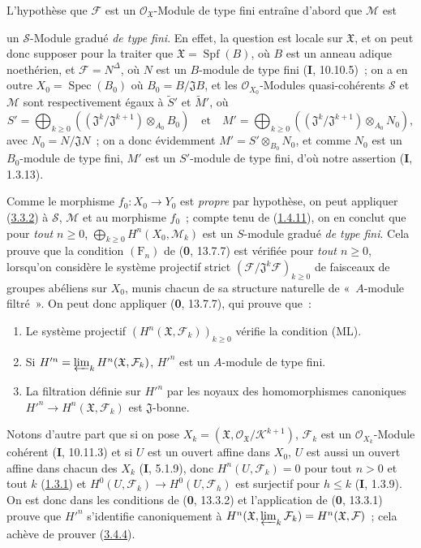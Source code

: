 L'hypothèse que $\mathcal F$ est un $\mathcal O_{\mathfrak X}$-Module de type
fini entraîne d'abord que $\mathcal M$ est

un $\mathcal S$-Module gradué \emph{de type fini}. En effet, la question est
locale sur $\mathfrak X$, et on peut donc supposer pour la traiter que
$\mathfrak X=\operatorname{Spf}(B)$, où $B$ est un anneau adique noethérien,
et $\mathcal F=N^\Delta$, où $N$ est un $B$-module de type fini
(\textbf{I}, 10.10.5)~; on a en outre $X_0=\operatorname{Spec}(B_0)$ où
$B_0=B/\mathfrak J B$, et les $\mathcal O_{X_0}$-Modules quasi-cohérents
$\mathcal S$ et $\mathcal M$ sont respectivement égaux à $\widetilde{S}'$ et
$\widetilde{M}'$, où
\[
S'=\bigoplus_{k\geq0}
((\mathfrak J^k/\mathfrak J^{k+1})\otimes_{A_0}B_0)\quad\text{et}\quad
M'=\bigoplus_{k\geq0}
((\mathfrak J^k/\mathfrak J^{k+1})\otimes_{A_0}N_0),
\]
avec $N_0=N/\mathfrak JN$~; on a donc évidemment
$M'=S'\otimes_{B_0}N_0$, et comme $N_0$ est un $B_0$-module de type fini,
$M'$ est un $S'$-module de type fini, d'où notre assertion (\textbf{I}, 1.3.13).

Comme le morphisme $f_0:X_0\to Y_0$ est \emph{propre} par hypothèse, on peut
appliquer (\hyperref[III.3.3.2-fr]{3.3.2}) à $\mathcal S$, $\mathcal M$ et au
morphisme $f_0$~; compte tenu de (\hyperref[III.1.4.11-fr]{1.4.11}), on en
conclut que pour \emph{tout $n\geq0$},
$\bigoplus_{k\geq0}H^n(X_0,\mathcal M_k)$ est un $S$-module gradué \emph{de
type fini}. Cela prouve que la condition $(\mathrm F_n)$ de (\textbf{0}, 13.7.7) est
vérifiée pour \emph{tout $n\geq0$}, lorsqu'on considère le système projectif
strict $(\mathcal F/\mathfrak J^k\mathcal F)_{k\geq0}$ de faisceaux de
groupes abéliens sur $X_0$, munis chacun de sa structure naturelle de
«~$A$-module filtré~». On peut donc appliquer (\textbf{0}, 13.7.7), qui prouve que~:
\begin{enumerate}
\item[$1^\circ$] Le système projectif
$(H^n(\mathfrak X,\mathcal F_k))_{k\geq0}$ vérifie la condition (ML).
\item[$2^\circ$] Si
$H'^{n}=\varprojlim_kH^n(\mathfrak X,\mathcal F_k)$, $H'^{n}$ est un
$A$-module de type fini.
\item[$3^\circ$] La filtration définie sur $H'^{n}$ par les noyaux des
homomorphismes canoniques $H'^{n}\to H^n(\mathfrak X,\mathcal F_k)$ est
$\mathfrak J$-bonne.
\end{enumerate}

Notons d'autre part que si on pose
$X_k=(\mathfrak X,\mathcal O_{\mathfrak X}/\mathcal K^{k+1})$,
$\mathcal F_k$ est un $\mathcal O_{X_k}$-Module cohérent (\textbf{I}, 10.11.3) et si
$U$ est un ouvert affine dans $X_0$, $U$ est aussi un ouvert affine dans
chacun des $X_k$ (\textbf{I}, 5.1.9), donc $H^n(U,\mathcal F_k)=0$ pour tout $n>0$ et
tout $k$ (\hyperref[III.1.3.1-fr]{1.3.1}) et
$H^0(U,\mathcal F_k)\to H^0(U,\mathcal F_h)$ est surjectif pour $h\leq k$
(\textbf{I}, 1.3.9). On est donc dans les conditions de (\textbf{0}, 13.3.2) et l'application
de (\textbf{0}, 13.3.1) prouve que $H'^{n}$ s'identifie canoniquement à
$H^n(\mathfrak X,\varprojlim_k\mathcal F_k)=H^n(\mathfrak X,\mathcal F)$~;
cela achève de prouver (\hyperref[III.3.4.4-fr]{3.4.4}).

